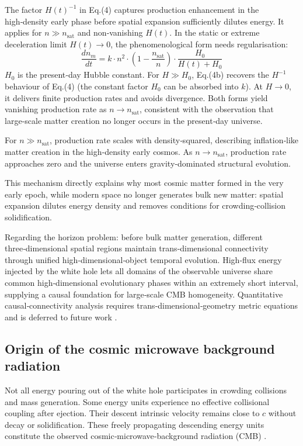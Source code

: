 \documentclass[12pt,a4paper]{article}
\begin{document}
The factor $H(t)^{-1}$ in Eq.(4) captures production enhancement in the high‑density early phase before spatial expansion sufficiently dilutes energy. It applies for $n\gg n_{\text{sat}}$ and non‑vanishing $H(t)$. In the static or extreme deceleration limit $H(t)\to0$, the phenomenological form needs regularisation:
\begin{equation*}
\frac{dn_m}{dt}=k\cdot n^2\cdot\left(1-\frac{n_{\text{sat}}}{n}\right)\cdot\frac{H_0}{H(t)+H_0}
\tag{4b}
\end{equation*}
$H_0$ is the present‑day Hubble constant. For $H\gg H_0$, Eq.(4b) recovers the $H^{-1}$ behaviour of Eq.(4) (the constant factor $H_0$ can be absorbed into $k$). At $H\to0$, it delivers finite production rates and avoids divergence. Both forms yield vanishing production rate as $n\to n_{\text{sat}}$, consistent with the observation that large‑scale matter creation no longer occurs in the present‑day universe.

For $n\gg n_{\text{sat}}$, production rate scales with density‑squared, describing inflation‑like matter creation in the high‑density early cosmos. As $n\to n_{\text{sat}}$, production rate approaches zero and the universe enters gravity‑dominated structural evolution.

This mechanism directly explains why most cosmic matter formed in the very early epoch, while modern space no longer generates bulk new matter: spatial expansion dilutes energy density and removes conditions for crowding‑collision solidification.

Regarding the horizon problem: before bulk matter generation, different three‑dimensional spatial regions maintain trans‑dimensional connectivity through unified high‑dimensional‑object temporal evolution. High‑flux energy injected by the white hole lets all domains of the observable universe share common high‑dimensional evolutionary phases within an extremely short interval, supplying a causal foundation for large‑scale CMB homogeneity. Quantitative causal‑connectivity analysis requires trans‑dimensional‑geometry metric equations and is deferred to future work \cite{guth1981,linde1982}.

\subsection{Origin of the cosmic microwave background radiation}
Not all energy pouring out of the white hole participates in crowding collisions and mass generation. Some energy units experience no effective collisional coupling after ejection. Their descent intrinsic velocity remains close to $c$ without decay or solidification. These freely propagating descending energy units constitute the observed cosmic‑microwave‑background radiation (CMB) \cite{penzias1965,smoot1992}.
\end{document}
